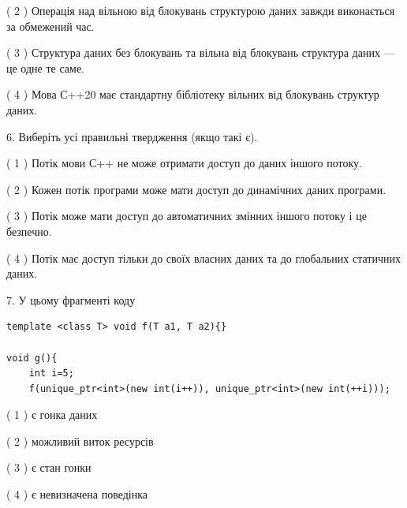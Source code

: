\documentclass[12pt, ukrainian]{article}
\begin{document}
\begin {large}
{( 2 ) Операція над вільною від блокувань структурою даних завжди виконається за обмежений час.%

( 3 ) Структура даних без блокувань та вільна від блокувань структура даних --- це одне те саме.%

( 4 ) Мова С++20 має стандартну бібліотеку вільних від блокувань структур даних.%
\newpage



\vspace{5mm}
6. Виберіть усі правильні твердження (якщо такі є).\par
\vspace{2mm}

( 1 ) Потік мови С++ не може отримати доступ до даних іншого потоку.%

( 2 ) Кожен потік програми може мати доступ до динамічних даних програми.%

( 3 ) Потік може мати доступ до автоматичних змінних іншого потоку і це безпечно.%

( 4 ) Потік має доступ тільки до своїх власних даних та до глобальних статичних даних.%


\vspace{5mm}
7. У цьому фрагменті коду
\begin{verbatim}
template <class T> void f(T a1, T a2){}

void g(){
    int i=5;
    f(unique_ptr<int>(new int(i++)), unique_ptr<int>(new int(++i)));
\end{verbatim}

( 1 ) є гонка даних%

( 2 ) можливий виток ресурсів%

( 3 ) є стан гонки%

( 4 ) є невизначена поведінка%
}
\end {large}
\end{document}
